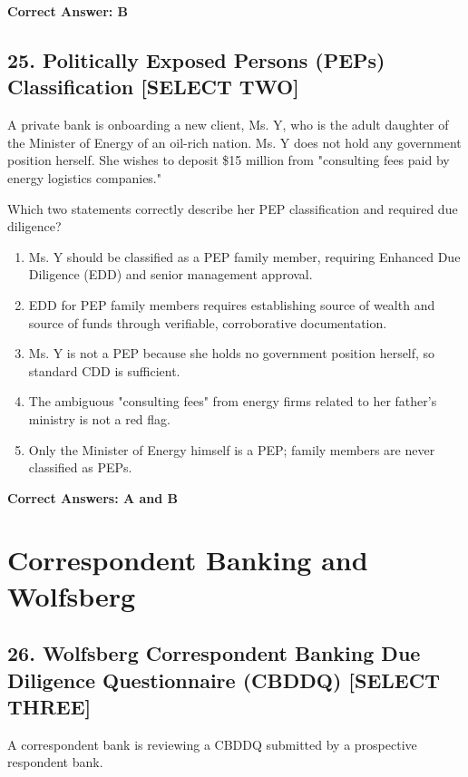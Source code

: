 \documentclass[11pt,a4paper]{article}
\begin{document}
	\textbf{Correct Answer: B}
	
	\subsection{25. Politically Exposed Persons (PEPs) Classification \textnormal{[SELECT TWO]}}
	
	A private bank is onboarding a new client, Ms. Y, who is the adult daughter of the Minister of Energy of an oil-rich nation. Ms. Y does not hold any government position herself. She wishes to deposit \$15 million from "consulting fees paid by energy logistics companies."
	
	Which two statements correctly describe her PEP classification and required due diligence?
	
	\begin{enumerate}[label=\Alph*.]
		\item Ms. Y should be classified as a PEP family member, requiring Enhanced Due Diligence (EDD) and senior management approval.
		\item EDD for PEP family members requires establishing source of wealth and source of funds through verifiable, corroborative documentation.
		\item Ms. Y is not a PEP because she holds no government position herself, so standard CDD is sufficient.
		\item The ambiguous "consulting fees" from energy firms related to her father's ministry is not a red flag.
		\item Only the Minister of Energy himself is a PEP; family members are never classified as PEPs.
	\end{enumerate}
	
	\textbf{Correct Answers: A and B}
	
	\section{Correspondent Banking and Wolfsberg}
	
	\subsection{26. Wolfsberg Correspondent Banking Due Diligence Questionnaire (CBDDQ) \textnormal{[SELECT THREE]}}
	
	A correspondent bank is reviewing a CBDDQ submitted by a prospective respondent bank.
	
\end{document}
